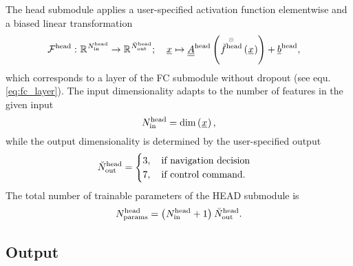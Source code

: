 The head submodule applies 
a user-specified activation function 
elementwise
and a biased linear transformation
\begin{align} \label{eq:head}
    \mathcal{F}^\head
    :\ &
    \mathbb{R}^{ \num[]{\head}{\inp}{}{} }
    \rightarrow 
    \mathbb{R}^{ \num[\user]{\head}{\outp}{}{} }
    ;\quad 
    \featvec[]{}{}{}{}
    \mapsto
    \underline{\underline A}^\head
    \left(
        \overset{\scriptscriptstyle \odot}{\func[\user]{\head}{}{}{}}
        \left(\featvec[]{}{}{}{}\right)
    \right)
    + \underline b^\head
    ,
\end{align}
which corresponds to a layer of the FC submodule
without dropout (see equ. \ref{eq:fc_layer}).
The input dimensionality adapts to the
number of features in the given input
\begin{equation}
    \num[]{\head}{\inp}{}{}
    =
    \dim \left(\featvec[]{}{}{}{}\right),
\end{equation}
while the output dimensionality
is determined by the user-specified output
\begin{equation}
    \num[\user]{\head}{\outp}{}{}
    = 
    \begin{cases}
        3
        ,\quad 
        \text{if navigation decision} 
        \\
        7
        ,\quad 
        \text{if control command.} 
    \end{cases}
\end{equation}
The total number of trainable parameters of the HEAD submodule is
\begin{equation}
    \num[]{\head}{\params}{}{}
    = 
    \left( \num[]{\head}{\inp}{}{} + 1 \right)
    \num[\user]{\head}{\outp}{}{}
    .
\end{equation}






%
\subsection*{Output}










